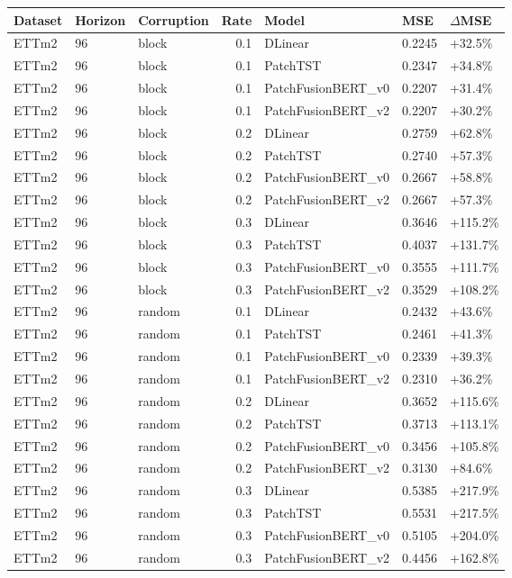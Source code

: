 \begin{tabular}{lllrlll}
\toprule
Dataset & Horizon & Corruption & Rate & Model & MSE & $\Delta$MSE \\
\midrule
ETTm2 & 96 & block & 0.1 & DLinear & 0.2245 & +32.5\% \\
ETTm2 & 96 & block & 0.1 & PatchTST & 0.2347 & +34.8\% \\
ETTm2 & 96 & block & 0.1 & PatchFusionBERT_v0 & 0.2207 & +31.4\% \\
ETTm2 & 96 & block & 0.1 & PatchFusionBERT_v2 & 0.2207 & +30.2\% \\
ETTm2 & 96 & block & 0.2 & DLinear & 0.2759 & +62.8\% \\
ETTm2 & 96 & block & 0.2 & PatchTST & 0.2740 & +57.3\% \\
ETTm2 & 96 & block & 0.2 & PatchFusionBERT_v0 & 0.2667 & +58.8\% \\
ETTm2 & 96 & block & 0.2 & PatchFusionBERT_v2 & 0.2667 & +57.3\% \\
ETTm2 & 96 & block & 0.3 & DLinear & 0.3646 & +115.2\% \\
ETTm2 & 96 & block & 0.3 & PatchTST & 0.4037 & +131.7\% \\
ETTm2 & 96 & block & 0.3 & PatchFusionBERT_v0 & 0.3555 & +111.7\% \\
ETTm2 & 96 & block & 0.3 & PatchFusionBERT_v2 & 0.3529 & +108.2\% \\
ETTm2 & 96 & random & 0.1 & DLinear & 0.2432 & +43.6\% \\
ETTm2 & 96 & random & 0.1 & PatchTST & 0.2461 & +41.3\% \\
ETTm2 & 96 & random & 0.1 & PatchFusionBERT_v0 & 0.2339 & +39.3\% \\
ETTm2 & 96 & random & 0.1 & PatchFusionBERT_v2 & 0.2310 & +36.2\% \\
ETTm2 & 96 & random & 0.2 & DLinear & 0.3652 & +115.6\% \\
ETTm2 & 96 & random & 0.2 & PatchTST & 0.3713 & +113.1\% \\
ETTm2 & 96 & random & 0.2 & PatchFusionBERT_v0 & 0.3456 & +105.8\% \\
ETTm2 & 96 & random & 0.2 & PatchFusionBERT_v2 & 0.3130 & +84.6\% \\
ETTm2 & 96 & random & 0.3 & DLinear & 0.5385 & +217.9\% \\
ETTm2 & 96 & random & 0.3 & PatchTST & 0.5531 & +217.5\% \\
ETTm2 & 96 & random & 0.3 & PatchFusionBERT_v0 & 0.5105 & +204.0\% \\
ETTm2 & 96 & random & 0.3 & PatchFusionBERT_v2 & 0.4456 & +162.8\% \\

\end{tabular}
